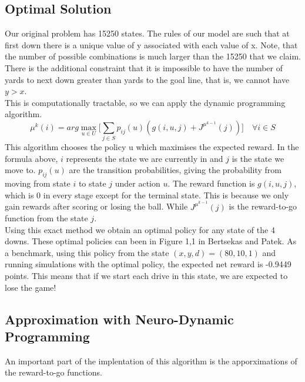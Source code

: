 \documentclass[11pt, oneside]{article}   	%
\begin{document}
\subsection{Optimal Solution}
Our original problem has 15250 states. The rules of our model are such that at first down there is a unique value of y associated with each value of x. Note, that the number of possible combinations is much larger than the 15250 that we claim. There is the additional constraint that it is impossible to have the number of yards to next down greater than yards to the goal line, that is, we cannot have $y>x$. \\

This is computationally tractable, so we can apply the dynamic programming algorithm. 
$$
\mu^{k}(i) = arg\max\limits_{u \in U} \Big[ \sum\limits_{j \in S} p_{ij}(u)(g(i,u,j) +  J^{\mu^{k-1}}(j))\Big] \quad \forall i \in S
$$
This algorithm chooses the policy u  which maximises the expected reward. In the formula above, $i$ represents the state we are currently in and $j$ is the state we move to. $p_{ij}(u)$ are the transition probabilities, giving the probability from moving from state $i$ to state $j$ under action $u$. The reward function is $g(i,u,j)$, which is 0 in every stage except for the terminal state. This is because we only gain rewards after scoring or losing the ball. While $J^{\mu^{k-1}}(j)$ is the reward-to-go  function from the state $j$. \\

Using this exact method we obtain an optimal policy for any state of the 4 downs. These optimal policies can been in Figure 1,1 in Bertsekas and Patek. As a benchmark, using this policy from the state $(x,y,d)=(80,10,1)$ and running simulations with the optimal policy, the expected net reward is -0.9449 points. This means that if we start each drive in this state, we are expected to lose the game!

\subsection{Approximation with Neuro-Dynamic Programming}
An important part of the implentation of this algorithm is the apporximations of the reward-to-go functions. 
\end{document}
